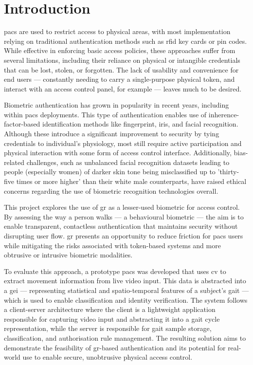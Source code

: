 \section{Introduction}
\label{sec:introduction}

\ac{pacs} are used to restrict access to physical areas, with most implementation relying on traditional authentication methods such as \ac{rfid} key cards or \ac{pin} codes.
While effective in enforcing basic access policies, these approaches suffer from several limitations, including their reliance on physical or intangible credentials that can be lost, stolen, or forgotten.
The lack of usability and convenience for end users --- constantly needing to carry a single-purpose physical token, and interact with an access control panel, for example --- leaves much to be desired.

Biometric authentication has grown in popularity in recent years, including within \ac{pacs} deployments.
This type of authentication enables use of inherence-factor-based identification methods like fingerprint, iris, and facial recognition.
Although these introduce a significant improvement to security by tying credentials to individual's physiology, most still require active participation and physical interaction with some form of access control interface.
Additionally, bias-related challenges, such as unbalanced facial recognition datasets leading to people (especially women) of darker skin tone being misclassified up to 'thirty-five times or more higher' than their white male counterparts, have raised ethical concerns regarding the use of biometric recognition technologies overall.

This project explores the use of \ac{gr} as a lesser-used biometric for access control.
By assessing the way a person walks --- a behavioural biometric --- the aim is to enable transparent, contactless authentication that maintains security without disrupting user flow.
\ac{gr} presents an opportunity to reduce friction for \ac{pacs} users while mitigating the risks associated with token-based systems and more obtrusive or intrusive biometric modalities.

To evaluate this approach, a prototype \ac{pacs} was developed that uses \ac{cv} to extract movement information from live video input.
This data is abstracted into a \ac{gei} --- representing statistical and spatio-temporal features of a subject's gait --- which is used to enable classification and identity verification.
The system follows a client-server architecture where the client is a lightweight application responsible for capturing video input and abstracting it into a gait cycle representation, while the server is responsible for gait sample storage, classification, and authorisation rule management.
The resulting solution aims to demonstrate the feasibility of \ac{gr}-based authentication and its potential for real-world use to enable secure, unobtrusive physical access control.

